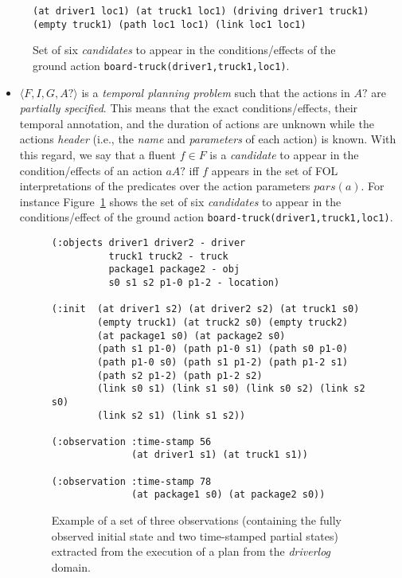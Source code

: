 \documentclass{ecai}
\newcommand{\tup}[1]{{\langle #1 \rangle}}
\begin{document}
\begin{figure}[hbt!]
\begin{scriptsize}    
\begin{verbatim}
(at driver1 loc1) (at truck1 loc1) (driving driver1 truck1) 
(empty truck1) (path loc1 loc1) (link loc1 loc1)
\end{verbatim}
\end{scriptsize}    
\caption{Set of six {\em candidates} to appear in the conditions/effects of the ground action {\tt board-truck(driver1,truck1,loc1)}.}
\label{fig:exampleCandidates}
\end{figure}  


\begin{itemize}
\item $\tup{F,I,G,A?}$ is a {\em temporal planning problem} such that the actions in $A?$ are {\em partially specified}. This means that the exact conditions/effects, their temporal annotation, and the duration of actions are unknown while the actions {\em header} (i.e., the {\em  name} and {\em parameters} of each action) is known. With this regard, we say that a fluent $f\in F$ is a {\em candidate} to appear in the condition/effects of an action $aA?$ iff $f$ appears in the set of FOL interpretations of the predicates over the action parameters $pars(a)$. For instance Figure~\ref{fig:exampleCandidates} shows the set of six {\em candidates} to appear in the conditions/effect of the ground action {\tt board-truck(driver1,truck1,loc1)}.
 
\begin{figure}[hbt!]
\begin{scriptsize}    
\begin{verbatim}
(:objects driver1 driver2 - driver
          truck1 truck2 - truck
          package1 package2 - obj
          s0 s1 s2 p1-0 p1-2 - location)

(:init	(at driver1 s2)	(at driver2 s2) (at truck1 s0)
        (empty truck1) (at truck2 s0) (empty truck2) 
        (at package1 s0) (at package2 s0)
        (path s1 p1-0) (path p1-0 s1) (path s0 p1-0) 
        (path p1-0 s0) (path s1 p1-2) (path p1-2 s1)
        (path s2 p1-2) (path p1-2 s2)
        (link s0 s1) (link s1 s0) (link s0 s2) (link s2 s0)
        (link s2 s1) (link s1 s2))

(:observation :time-stamp 56
              (at driver1 s1) (at truck1 s1))

(:observation :time-stamp 78
              (at package1 s0) (at package2 s0))
\end{verbatim}
\end{scriptsize}    
\caption{Example of a set of three observations (containing the fully observed initial state and two time-stamped partial states) extracted from the execution of a plan from the {\em driverlog} domain.}
\label{fig:exampleObservations}
\end{figure}  


\end{itemize}
\end{document}
